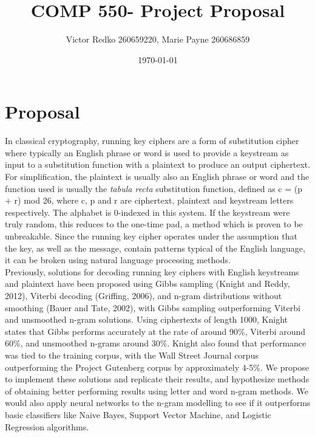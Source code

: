 \documentclass[letterpaper,12pt]{article}
\begin{document}
	
	\title{COMP 550- Project Proposal}
	\author{Victor Redko 260659220, Marie Payne 260686859}
	\date{\today}
	\maketitle
	

\section{Proposal}
In classical cryptography, running key ciphers are a form of substitution cipher where typically an English phrase or word is used to provide a keystream as input to a substitution function with a plaintext to produce an output ciphertext. For simplification, the plaintext is usually also an English phrase or word and the  function used is usually the \textit{tabula recta} substitution function, defined as c = (p + r) mod 26, where c, p and r are ciphertext, plaintext and keystream letters respectively. The alphabet is 0-indexed in this system. If the keystream were truly random, this reduces to the one-time pad, a method which is proven to be unbreakable. Since the running key cipher operates under the assumption that the key, as well as the message, contain patterns typical of the English language, it can be broken using natural language processing methods.\\
\hfill \break
Previously, solutions for decoding running key ciphers with English keystreams and plaintext have been proposed using Gibbs sampling (Knight and Reddy, 2012), Viterbi decoding (Griffing, 2006), and n-gram distributions without smoothing (Bauer and Tate, 2002), with Gibbs sampling outperforming Viterbi and unsmoothed n-gram solutions. Using ciphertexts of length 1000, Knight states that Gibbs performs accurately at the rate of around 90\%, Viterbi around 60\%, and unsmoothed n-grams around 30\%. Knight also found that performance was tied to the training corpus, with the Wall Street Journal corpus outperforming the Project Gutenberg corpus by approximately 4-5\%. We propose to implement these solutions and replicate their results, and hypothesize methods of obtaining better performing results using letter and word n-gram methods. We would also apply neural networks to the n-gram modelling to see if it outperforms basic classifiers like Naive Bayes, Support Vector Machine, and Logistic Regression algorithms. 


\end{document}
